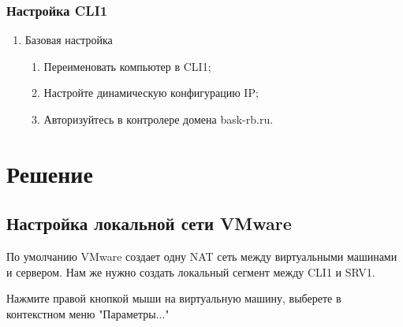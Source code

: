 \documentclass[a4paper, 12pt]{report}
\begin{document}
	\subsubsection{Настройка CLI1}

	\begin{enumerate}
		\item Базовая настройка
		\begin{enumerate}
			\item Переименовать компьютер в CLI1;
			\item Настройте динамическую конфигурацию IP;
			\item Авторизуйтесь в контролере домена bask-rb.ru.
		\end{enumerate}
	\end{enumerate}

	\clearpage
	
	\section{Решение}
	
	\subsection{Настройка локальной сети VMware}
	
	По умолчанию VMware создает одну NAT сеть между виртуальными машинами и сервером. Нам же нужно создать локальный сегмент между CLI1 и SRV1.
	
	Нажмите правой кнопкой мыши на виртуальную машину, выберете в контекстном меню "Параметры..."
	
	\begin{figure}[h]
		\label{fig:image}
	\end{figure}
\end{document}
